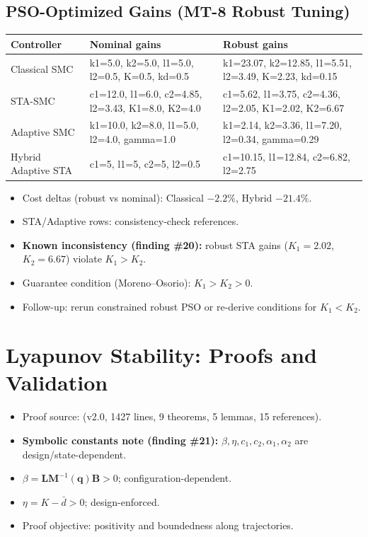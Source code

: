 \documentclass[10pt, a4paper]{article}
\newcommand{\vq}{\boldsymbol{q}}
\begin{document}
\subsection{PSO-Optimized Gains (MT-8 Robust Tuning)}

\begin{center}
\small
\begin{tabularx}{\columnwidth}{@{}p{2.2cm}YY@{}}
\toprule
\textbf{Controller} & \textbf{Nominal gains} & \textbf{Robust gains} \\
\midrule
Classical SMC &
k1=5.0, k2=5.0, l1=5.0, l2=0.5, K=0.5, kd=0.5 &
k1=23.07, k2=12.85, l1=5.51, l2=3.49, K=2.23, kd=0.15 \\
STA-SMC &
c1=12.0, l1=6.0, c2=4.85, l2=3.43, K1=8.0, K2=4.0 &
c1=5.62, l1=3.75, c2=4.36, l2=2.05, K1=2.02, K2=6.67 \\
Adaptive SMC &
k1=10.0, k2=8.0, l1=5.0, l2=4.0, gamma=1.0 &
k1=2.14, k2=3.36, l1=7.20, l2=0.34, gamma=0.29 \\
Hybrid Adaptive STA &
c1=5, l1=5, c2=5, l2=0.5 &
c1=10.15, l1=12.84, c2=6.82, l2=2.75 \\
\bottomrule
\end{tabularx}
\end{center}

\begin{itemize}[leftmargin=1.5em,itemsep=0.2em]
  \item Cost deltas (robust vs nominal): Classical $-2.2\%$, Hybrid $-21.4\%$.
  \item STA/Adaptive rows: consistency-check references.
  \item \textbf{Known inconsistency (finding \#20):}
  robust STA gains ($K_1=2.02$, $K_2=6.67$) violate $K_1>K_2$.
  \item Guarantee condition (Moreno--Osorio): $K_1>K_2>0$.
  \item Follow-up: rerun constrained robust PSO or re-derive conditions for $K_1<K_2$.
\end{itemize}

\section{Lyapunov Stability: Proofs and Validation}

\begin{itemize}[leftmargin=1.5em,itemsep=0.2em]
  \item Proof source:
  (v2.0, 1427 lines, 9 theorems, 5 lemmas, 15 references).
  \item \textbf{Symbolic constants note (finding \#21):}
  $\beta,\eta,c_1,c_2,\alpha_1,\alpha_2$ are design/state-dependent.
  \item $\beta = \mathbf{L}\mathbf{M}^{-1}(\vq)\mathbf{B} > 0$; configuration-dependent.
  \item $\eta = K-\bar{d} > 0$; design-enforced.
  \item Proof objective: positivity and boundedness along trajectories.
\end{itemize}
\end{document}
